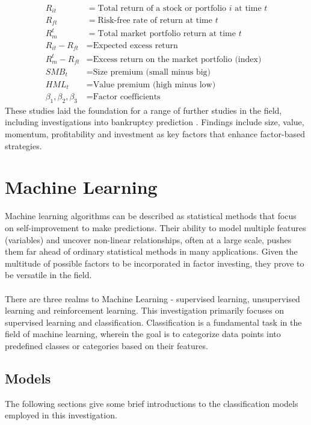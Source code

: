 \documentclass[a4paper]{report}
\begin{document}
\begin{align*}
  R_{it} &= \text{Total return of a stock or portfolio } i \text{ at time } t \\
  R_{ft} &= \text{Risk-free rate of return at time } t \\
  R_m^t &= \text{Total market portfolio return at time } t \\
  R_{it} - R_{ft} &= \text{Expected excess return} \\
  R_m^t - R_{ft} &= \text{Excess return on the market portfolio (index)} \\
  SMB_t &= \text{Size premium (small minus big)} \\
  HML_t &= \text{Value premium (high minus low)} \\
  \beta_1, \beta_2, \beta_3 &= \text{Factor coefficients}
\end{align*}
These studies laid the foundation for a range of further studies in the field, including investigations into bankruptcy prediction \citep{altman1968financial}. Findings include 
size, value, momentum, profitability and investment as key factors that enhance factor-based strategies.


\section{Machine Learning}
Machine learning algorithms can be described as statistical methods that focus on self-improvement to make predictions. Their ability to model 
multiple features (variables) and uncover non-linear relationships, often at a large scale, pushes them far ahead of ordinary statistical methods in many applications. Given 
the multitude of possible factors to be incorporated in factor investing, they prove to be versatile in the field.\\\\There are three realms to Machine Learning - 
supervised learning, unsupervised learning and reinforcement learning. This investigation primarily focuses on supervised learning and classification. Classification is a 
fundamental task in the field of machine learning, wherein the goal is to categorize data points into predefined classes or categories based on their features. 

\subsection{Models}
The following sections give some brief introductions to the classification models employed in this investigation.
\end{document}
